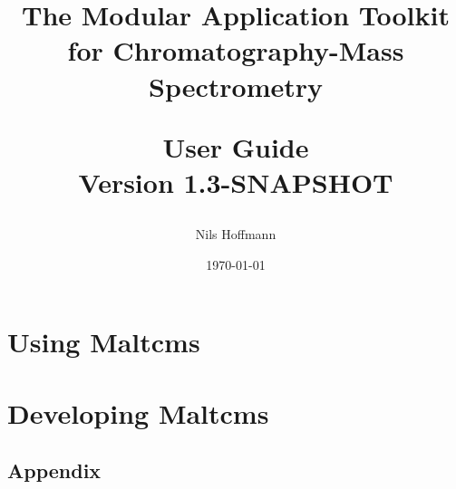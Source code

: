 \documentclass[10pt,a4paper,onecolumn,twoside,titlepage,headsepline,open=any]{scrbook}
\author{Nils Hoffmann}
\title{The Modular Application Toolkit for Chromatography-Mass Spectrometry\\\vspace{1ex}\begin{Large}
User Guide\\
Version 1.3-SNAPSHOT
\end{Large}}
\date{\today}
\begin{document}
\frontmatter    %
\maketitle       %





\tableofcontents   %
 
\mainmatter    %

\part{Using Maltcms}


\part{Developing Maltcms}

\backmatter
\chapter{Appendix}
\lstlistoflistings
\printglossaries
\end{document}
